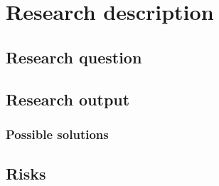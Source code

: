\section{Research description}
\subsection{Research question}

\subsection{Research output}
\label{sec:researchoutput}

\subsubsection{Possible solutions}

\subsection{Risks}